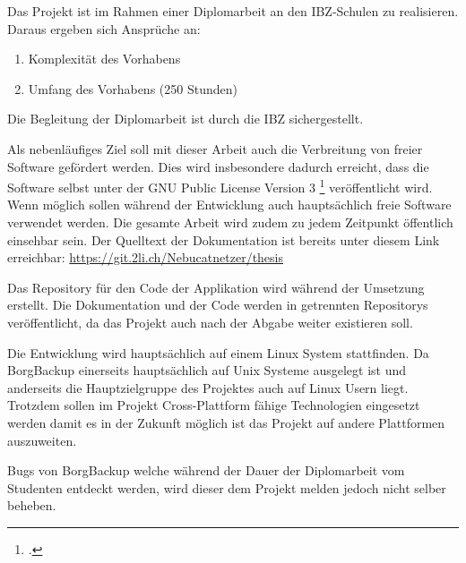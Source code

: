 Das Projekt ist im Rahmen einer Diplomarbeit an den IBZ-Schulen zu realisieren.
Daraus ergeben sich Ansprüche an:

\begin{enumerate}
\item Komplexität des Vorhabens
\item Umfang des Vorhabens (250 Stunden)
\end{enumerate}

Die Begleitung der Diplomarbeit ist durch die IBZ sichergestellt.

Als nebenläufiges Ziel soll mit dieser Arbeit auch die Verbreitung von freier
Software gefördert werden. Dies wird insbesondere dadurch erreicht, dass die
Software selbst unter der GNU Public License Version 3 \footcite{gplv3}
veröffentlicht wird. Wenn möglich sollen während der Entwicklung auch
hauptsächlich freie Software verwendet werden. Die gesamte Arbeit wird zudem zu
jedem Zeitpunkt öffentlich einsehbar sein. Der Quelltext der Dokumentation ist
bereits unter diesem Link erreichbar: \url{https://git.2li.ch/Nebucatnetzer/thesis}

Das Repository für den Code der Applikation wird während der Umsetzung erstellt.
Die Dokumentation und der Code werden in getrennten Repositorys veröffentlicht,
da das Projekt auch nach der Abgabe weiter existieren soll.

Die Entwicklung wird hauptsächlich auf einem Linux System stattfinden. Da
BorgBackup einerseits hauptsächlich auf Unix Systeme ausgelegt ist und
anderseits die Hauptzielgruppe des Projektes auch auf Linux Usern liegt.
Trotzdem sollen im Projekt Cross-Plattform fähige Technologien eingesetzt werden
damit es in der Zukunft möglich ist das Projekt auf andere Plattformen
auszuweiten.

Bugs von BorgBackup welche während der Dauer der Diplomarbeit vom Studenten
entdeckt werden, wird dieser dem Projekt melden jedoch nicht selber beheben.

